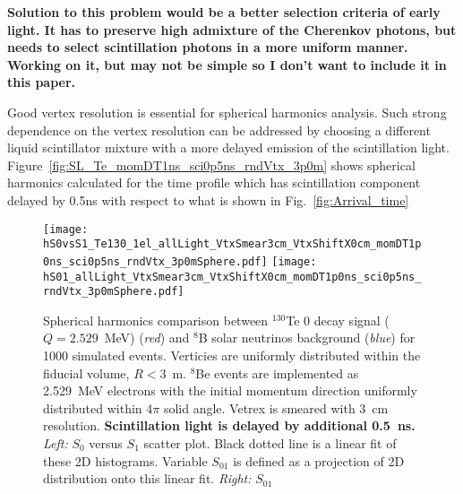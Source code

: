 {\bf Solution to this problem would be a better selection criteria of
  early light. It has to preserve high admixture of the Cherenkov
  photons, but needs to select scintillation photons in a more uniform
  manner. Working on it, but may not be simple so I don't want to
  include it in this paper.}

Good vertex resolution is essential for spherical harmonics
analysis. Such strong dependence on the vertex resolution can be
addressed by choosing a different liquid scintillator mixture with a
more delayed emission of the scintillation
light. Figure~\ref{fig:SL_Te_momDT1ns_sci0p5ns_rndVtx_3p0m} shows
spherical harmonics calculated for the time profile which has
scintillation component delayed by 0.5ns with respect to what is shown
in Fig.~\ref{fig:Arrival_time}


\begin{figure*}[h]
  \centering
  \texttt{[image: hS0vsS1\_Te130\_1el\_allLight\_VtxSmear3cm\_VtxShiftX0cm\_momDT1p0ns\_sci0p5ns\_rndVtx\_3p0mSphere.pdf]}
  \texttt{[image: hS01\_allLight\_VtxSmear3cm\_VtxShiftX0cm\_momDT1p0ns\_sci0p5ns\_rndVtx\_3p0mSphere.pdf]}
  \caption{Spherical harmonics comparison between $^{130}$Te 0{\nbb}
    decay signal ($Q=2.529$~MeV) (\emph{red}) and $^{8}$B solar
    neutrinos background (\emph{blue}) for 1000 simulated
    events. Verticies are uniformly distributed within the fiducial
    volume, $R<3$~m. $^8$Be events are implemented as 2.529~MeV
    electrons with the initial momentum direction uniformly
    distributed within 4$\pi$ solid angle. Vetrex is smeared with 3~cm
    resolution. {\bf Scintillation light is delayed by additional
      0.5~ns.} \emph{Left:} $S_0$ versus $S_1$ scatter plot. Black dotted
    line is a linear fit of these 2D histograms. Variable $S_{01}$ is
    defined as a projection of 2D distribution onto this linear
    fit. \emph{Right:} $S_{01}$}
\label{fig:SL_Te_SmearX3cm_momDT1ns_sci0p5ns_rndVtx_3p0m}
\end{figure*}

